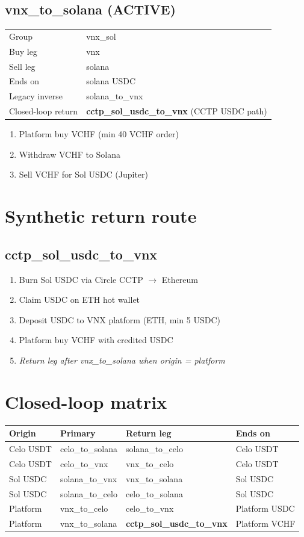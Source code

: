 \documentclass[11pt,a4paper]{article}
\begin{document}
\subsection*{\textcolor{okgreen}{vnx\_to\_solana} (ACTIVE)}
\begin{tabular}{@{}ll@{}}
Group & vnx\_sol \\
Buy leg & vnx \\
Sell leg & solana \\
Ends on & solana USDC \\
Legacy inverse & solana\_to\_vnx \\
Closed-loop return & \textbf{cctp\_sol\_usdc\_to\_vnx} (CCTP USDC path) \\
\end{tabular}
\begin{enumerate}[nosep,leftmargin=*]
\item Platform buy VCHF (min 40 VCHF order)
\item Withdraw VCHF to Solana
\item Sell VCHF for Sol USDC (Jupiter)
\end{enumerate}
\section*{Synthetic return route}
\subsection*{cctp\_sol\_usdc\_to\_vnx}
\begin{enumerate}[nosep,leftmargin=*]
\item Burn Sol USDC via Circle CCTP $\rightarrow$ Ethereum
\item Claim USDC on ETH hot wallet
\item Deposit USDC to VNX platform (ETH, min 5 USDC)
\item Platform buy VCHF with credited USDC
\item \textit{Return leg after vnx\_to\_solana when origin = platform}
\end{enumerate}
\section*{Closed-loop matrix}
\small
\begin{longtable}{@{}llll@{}}
\toprule
Origin & Primary & Return leg & Ends on \\
\midrule
\endhead
Celo USDT & celo\_to\_solana & solana\_to\_celo & Celo USDT \\
Celo USDT & celo\_to\_vnx & vnx\_to\_celo & Celo USDT \\
Sol USDC & solana\_to\_vnx & vnx\_to\_solana & Sol USDC \\
Sol USDC & solana\_to\_celo & celo\_to\_solana & Sol USDC \\
Platform & vnx\_to\_celo & celo\_to\_vnx & Platform USDC \\
Platform & vnx\_to\_solana & \textbf{cctp\_sol\_usdc\_to\_vnx} & Platform VCHF \\
\bottomrule
\end{longtable}
\normalsize
\end{document}
